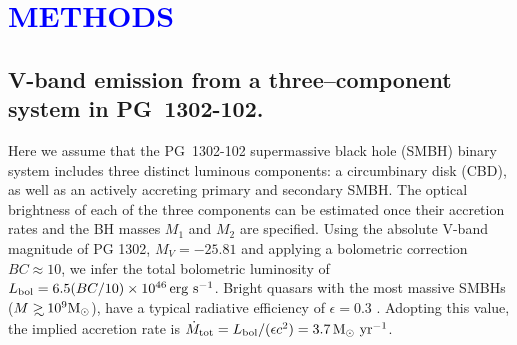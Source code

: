 %

\section*{\large\textcolor{blue}{METHODS}}
\subsection{V-band emission from a three--component system in PG~1302-102.}

Here we assume that the PG~1302-102 supermassive black hole (SMBH)
binary system includes three distinct luminous components: a
circumbinary disk (CBD), as well as an actively accreting primary and
secondary SMBH.  The optical brightness of each of the three
components can be estimated once their accretion rates and the BH
masses $M_1$ and $M_2$ are specified.  Using the absolute V-band
magnitude of PG 1302, $M_V = -25.81$ and applying a bolometric
correction $BC \approx 10$, \cite{RichardsQBCs:2006} we infer the
total bolometric luminosity of $L_{\rm bol}=6.5 (BC/10) \times
10^{46}\, {\rm erg~s^{-1}}$.  Bright quasars with the most massive
SMBHs ($M\gsim 10^9{\rm M_\odot}$), have a typical radiative
efficiency of $\epsilon=0.3$
\cite{YuTremaine2002}.  Adopting this value, the implied accretion
rate is $\dot{M}_{\rm tot} = L_{\rm{bol}}/(\epsilon c^2) = 3.7\, {\rm
  M_\odot~yr^{-1}}$.



